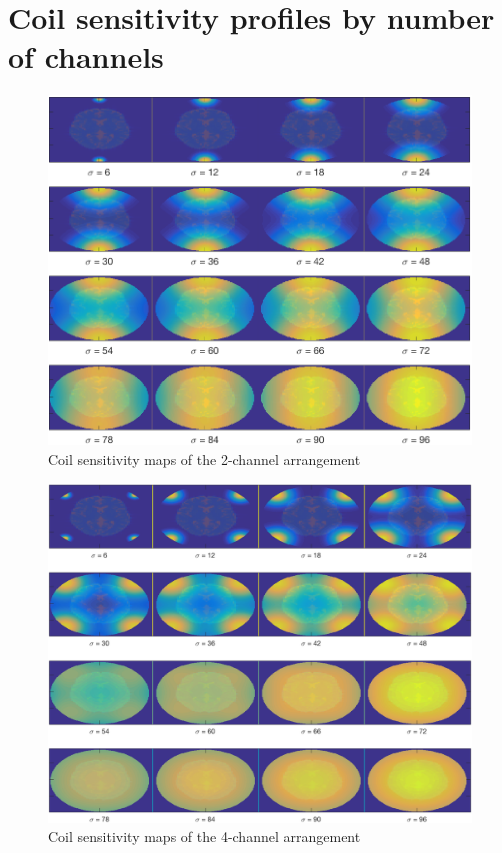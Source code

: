 
\appendix
\chapter{Coil sensitivity profiles by number of channels}
\label{appendixlabel1}

\begin{figure}[H]
    \centering
    \includegraphics[width=.8\textwidth,keepaspectratio]{2coilsdifsigmas}
    \caption{Coil sensitivity maps of the 2-channel arrangement}
\end{figure}

\begin{figure}[H]
    \centering
    \includegraphics[width=.8\textwidth,keepaspectratio]{4coilsdifsigmas}
    \caption{Coil sensitivity maps of the 4-channel arrangement}
\end{figure}

